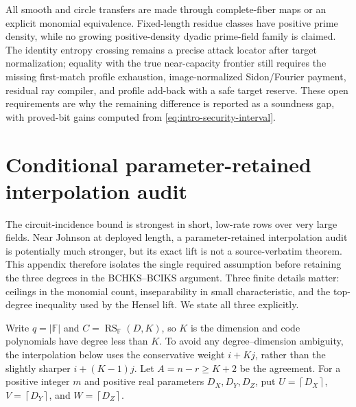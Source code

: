\documentclass[11pt,a4paper]{amsart}
\numberwithin{equation}{section}
\theoremstyle{remark}
\DeclareMathOperator{\RS}{RS}
\newcommand{\F}{\mathbb F}
\newcommand{\abs}[1]{\lvert #1\rvert}
\newcommand{\ceil}[1]{\left\lceil #1\right\rceil}
\begin{document}
All smooth and circle transfers are made through complete-fiber maps or
an explicit monomial equivalence.  Fixed-length residue classes have
positive prime density, while no growing positive-density dyadic
prime-field family is claimed.  The identity entropy crossing remains a
precise attack locator after target normalization; equality with the true
near-capacity frontier still requires the missing first-match profile
exhaustion, image-normalized Sidon/Fourier payment, residual ray compiler,
and profile add-back with a safe target reserve.  These open
requirements are why the remaining difference is reported as a
soundness gap, with proved-bit gains computed from
\eqref{eq:intro-security-interval}.

\appendix
\section{Conditional parameter-retained interpolation audit}
\label{app:retained-interpolation}

The circuit-incidence bound is strongest in short, low-rate rows over very large
fields.  Near Johnson at deployed length, a parameter-retained
interpolation audit is potentially much stronger, but its exact lift is
not a source-verbatim theorem.  This appendix therefore isolates the
single required assumption before retaining the three degrees in the
BCHKS--BCIKS argument.  Three finite details
matter: ceilings in the monomial count, inseparability in small
characteristic, and the top-degree inequality used by the Hensel lift.
We state all three explicitly.

Write \(q=\abs\F\) and \(C=\RS_\F(D,K)\), so \(K\) is the dimension and code
polynomials have degree less than \(K\).  To avoid any degree--dimension
ambiguity, the interpolation below uses the conservative weight
\(i+Kj\), rather than the slightly sharper \(i+(K-1)j\).  Let
\(A=n-r\ge K+2\) be the agreement.  For a positive integer \(m\) and
positive real parameters \(D_X,D_Y,D_Z\), put
\(U=\ceil{D_X}\), \(V=\ceil{D_Y}\), and \(W=\ceil{D_Z}\).
\end{document}
